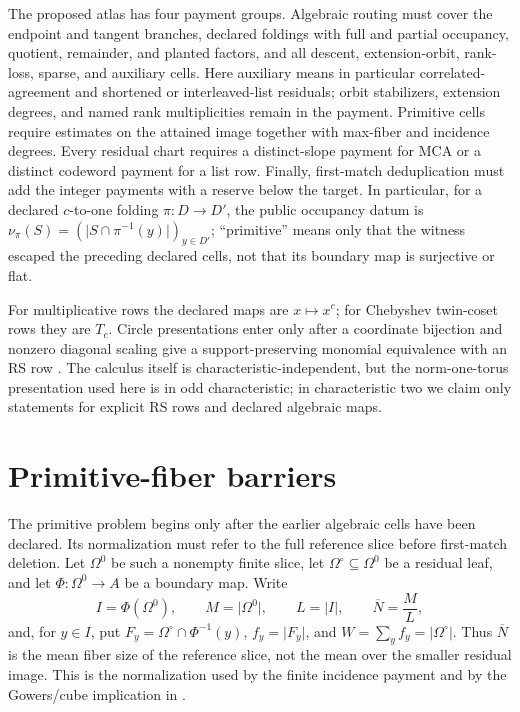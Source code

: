 \documentclass[a4paper,11pt]{amsart}
\theoremstyle{remark}
\newcommand{\Om}{\Omega}
\newcommand{\barN}{\overline N}
\newcommand{\abs}[1]{\lvert#1\rvert}
\begin{document}
The proposed atlas has four payment groups.  Algebraic routing must cover the
endpoint and tangent branches, declared foldings with full and partial
occupancy, quotient, remainder, and planted factors, and all descent,
extension-orbit, rank-loss, sparse, and auxiliary cells.  Here auxiliary
means in particular correlated-agreement and shortened or interleaved-list
residuals; orbit stabilizers, extension degrees, and named rank
multiplicities remain in the payment.  Primitive cells require estimates on
the attained image together with max-fiber and incidence degrees.  Every
residual chart requires a distinct-slope payment for MCA or a distinct
codeword payment for a list row.  Finally, first-match deduplication must add
the integer payments with a reserve below the target.  In particular, for a
declared \(c\)-to-one folding \(\pi:D\to D'\), the public occupancy datum is
\(\nu_\pi(S)=(\abs{S\cap\pi^{-1}(y)})_{y\in D'}\); ``primitive'' means only
that the witness escaped the preceding declared cells, not that its boundary
map is surjective or flat.

For multiplicative rows the declared maps are \(x\mapsto x^c\); for
Chebyshev twin-coset rows they are \(T_c\).  Circle presentations enter only
after a coordinate bijection and nonzero diagonal scaling give a
support-preserving monomial equivalence with an RS row
\cite{HLP24,ChoShortening}.  The calculus itself is
characteristic-independent, but the norm-one-torus presentation used here is
in odd characteristic; in characteristic two we claim only statements for
explicit RS rows and declared algebraic maps.

\section{Primitive-fiber barriers}\label{sec:primitive}

The primitive problem begins only after the earlier algebraic cells have been
declared.  Its normalization must refer to the full reference slice before
first-match deletion.  Let \(\Om^0\) be such a nonempty finite slice, let
\(\Om^\circ\subseteq\Om^0\) be a residual leaf, and let
\(\Phi:\Om^0\to A\) be a boundary map.  Write
\[
 I=\Phi(\Om^0),\qquad M=\abs{\Om^0},\qquad L=\abs I,
 \qquad \barN=\frac ML,
\]
and, for \(y\in I\), put
\(F_y=\Om^\circ\cap\Phi^{-1}(y)\), \(f_y=\abs{F_y}\), and
\(W=\sum_yf_y=\abs{\Om^\circ}\).  Thus \(\barN\) is the mean fiber size of
the reference slice, not the mean over the smaller residual image.  This is
the normalization used by the finite incidence payment and by the
Gowers/cube implication in \cite{ChoShortening}.
\end{document}
